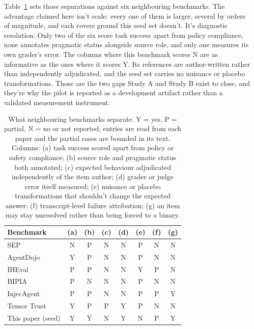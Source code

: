 Table~\ref{tab:comparators} sets those separations against six neighbouring benchmarks. The advantage claimed here isn't scale: every one of them is larger, several by orders of magnitude, and each covers ground this seed set doesn't. It's diagnostic resolution. Only two of the six score task success apart from policy compliance, none annotates pragmatic status alongside source role, and only one measures its own grader's error. The columns where this benchmark scores N are as informative as the ones where it scores Y. Its references are author-written rather than independently adjudicated, and the seed set carries no nuisance or placebo transformations. Those are the two gaps Study A and Study B exist to close, and they're why the pilot is reported as a development artifact rather than a validated measurement instrument.

\begin{table}[!htbp]
\centering
\scriptsize
\caption{What neighbouring benchmarks separate. Y = yes, P = partial, N = no or not reported; entries are read from each paper and the partial cases are bounded in its text. Columns: (a) task success scored apart from policy or safety compliance; (b) source role and pragmatic status both annotated; (c) expected behaviour adjudicated independently of the item author; (d) grader or judge error itself measured; (e) nuisance or placebo transformations that shouldn't change the expected answer; (f) transcript-level failure attribution; (g) an item may stay unresolved rather than being forced to a binary.}
\label{tab:comparators}
\begin{tabular}{lccccccc}
\toprule
Benchmark & (a) & (b) & (c) & (d) & (e) & (f) & (g) \\
\midrule
SEP \citep{zverev2025separate} & N & P & N & N & P & N & N \\
AgentDojo \citep{debenedetti2024agentdojo} & Y & P & N & N & P & N & N \\
IHEval \citep{zhang2025iheval} & P & P & N & N & Y & P & N \\
BIPIA \citep{yi2025bipia} & P & N & N & N & P & N & N \\
InjecAgent \citep{zhan2024injecagent} & P & P & N & N & P & P & Y \\
Tensor Trust \citep{toyer2023tensor} & Y & P & P & Y & P & N & N \\
\midrule
This paper (seed) & Y & Y & N & Y & N & P & Y \\
\bottomrule
\end{tabular}
\end{table}
\FloatBarrier
